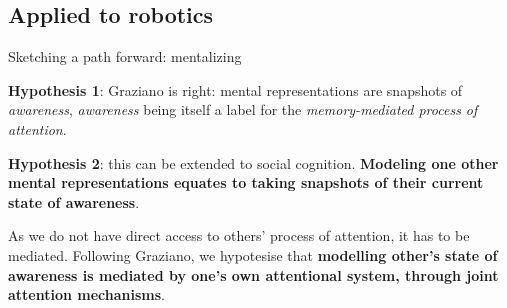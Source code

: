 \documentclass[compress]{beamer}
\begin{document}
\subsection{Applied to robotics}
\begin{frame}{Sketching a path forward: mentalizing}

    {\bf Hypothesis 1}: Graziano is right: mental representations are snapshots of
    \emph{awareness}, \emph{awareness} being itself a label for the
    \emph{memory-mediated process of attention}.

    \pause

    {\bf Hypothesis 2}: this can be extended to social cognition. \textbf{Modeling one
    other mental representations equates to taking snapshots of their current
    state of awareness}.

    As we do not have direct access to others' process of attention, it has to
    be mediated. Following Graziano, we hypotesise that \textbf{modelling other's
    state of awareness is mediated by one's own attentional system, through
    joint attention mechanisms}.


\end{frame}
\end{document}
